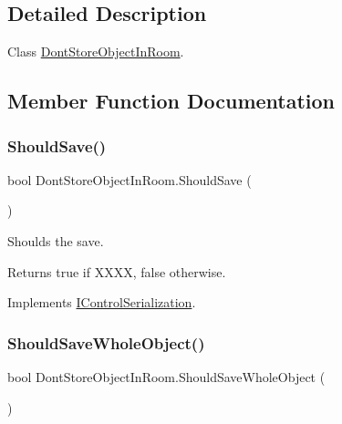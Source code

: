 \subsection{Detailed Description}
Class \hyperlink{class_dont_store_object_in_room}{Dont\+Store\+Object\+In\+Room}. 



\subsection{Member Function Documentation}
\mbox{\label{class_dont_store_object_in_room_a710cc83ab8e061a58175a2c5bf3afa89}} 
\subsubsection{\texorpdfstring{Should\+Save()}{ShouldSave()}}
{\footnotesize\ttfamily bool Dont\+Store\+Object\+In\+Room.\+Should\+Save (\begin{DoxyParamCaption}{ }\end{DoxyParamCaption})\hspace{0.3cm}{\ttfamily [inline]}}



Shoulds the save. 

\begin{DoxyReturn}{Returns}
{\ttfamily true} if X\+X\+XX, {\ttfamily false} otherwise.
\end{DoxyReturn}


Implements \hyperlink{interface_i_control_serialization_af1036cb8968dc0508a7d1804a4c1feed}{I\+Control\+Serialization}.

\mbox{\label{class_dont_store_object_in_room_ae64064ac5b1759f7a5694a4f617a03ed}} 
\subsubsection{\texorpdfstring{Should\+Save\+Whole\+Object()}{ShouldSaveWholeObject()}}
{\footnotesize\ttfamily bool Dont\+Store\+Object\+In\+Room.\+Should\+Save\+Whole\+Object (\begin{DoxyParamCaption}{ }\end{DoxyParamCaption})\hspace{0.3cm}{\ttfamily [inline]}}



